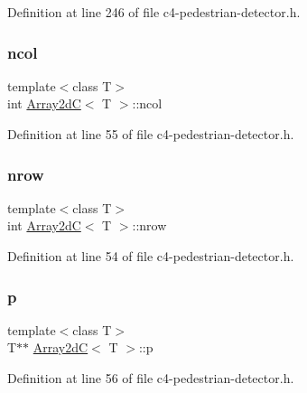 Definition at line 246 of file c4-\/pedestrian-\/detector.\+h.

\mbox{\label{class_array2d_c_a27e0f8f40f644831cd7c750db59dc28a}} 
\subsubsection{\texorpdfstring{ncol}{ncol}}
{\footnotesize\ttfamily template$<$class T$>$ \\
int \mbox{\hyperlink{class_array2d_c}{Array2dC}}$<$ T $>$\+::ncol\hspace{0.3cm}{\ttfamily [inherited]}}



Definition at line 55 of file c4-\/pedestrian-\/detector.\+h.

\mbox{\label{class_array2d_c_a12f690f7195f7674a86a7e1eedbc473c}} 
\subsubsection{\texorpdfstring{nrow}{nrow}}
{\footnotesize\ttfamily template$<$class T$>$ \\
int \mbox{\hyperlink{class_array2d_c}{Array2dC}}$<$ T $>$\+::nrow\hspace{0.3cm}{\ttfamily [inherited]}}



Definition at line 54 of file c4-\/pedestrian-\/detector.\+h.

\mbox{\label{class_array2d_c_a727eae5d663d463635cc150e6f771f0d}} 
\subsubsection{\texorpdfstring{p}{p}}
{\footnotesize\ttfamily template$<$class T$>$ \\
T$\ast$$\ast$ \mbox{\hyperlink{class_array2d_c}{Array2dC}}$<$ T $>$\+::p\hspace{0.3cm}{\ttfamily [inherited]}}



Definition at line 56 of file c4-\/pedestrian-\/detector.\+h.

